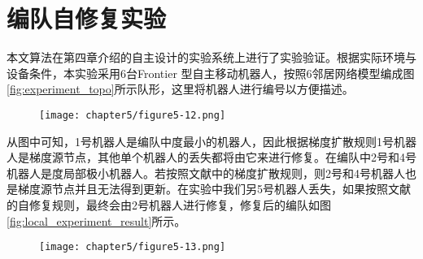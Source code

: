 \section{编队自修复实验}
本文算法在第四章介绍的自主设计的实验系统上进行了实验验证。根据实际环境与设备条件，本实验采用6台Frontier \uppercase\expandafter{}型自主移动机器人，按照6邻居网络模型编成图\ref{fig:experiment_topo}所示队形，这里将机器人进行编号以方便描述。
\begin{figure}[!htbp]
	\centering
	\texttt{[image: chapter5/figure5-12.png]}
\end{figure}
从图中可知，1号机器人是编队中度最小的机器人，因此根据梯度扩散规则1号机器人是梯度源节点，其他单个机器人的丢失都将由它来进行修复。在编队中2号和4号机器人是度局部极小机器人。若按照文献\parencite{liu2015gradient}中的梯度扩散规则，则2号和4号机器人也是梯度源节点并且无法得到更新。在实验中我们另5号机器人丢失，如果按照文献\parencite{liu2015gradient}的自修复规则，最终会由2号机器人进行修复，修复后的编队如图\ref{fig:local_experiment_result}所示。
\begin{figure}
	\centering
	\texttt{[image: chapter5/figure5-13.png]}
\end{figure}

\begin{figure*}[!htbp]
	\centering
\end{figure*}

